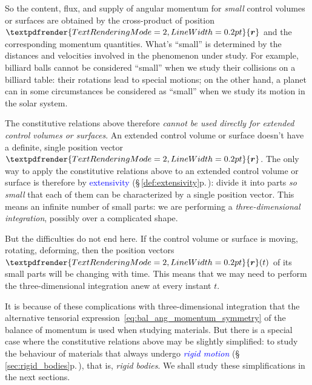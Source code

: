 \documentclass[a4paper,12pt,%
onecolumn,oneside,%
british%
]{memoir}
\renewcommand*{\bm}[1]{\textpdfrender{TextRenderingMode=2,LineWidth=0.2pt}{\boldsymbol{#1}}}
\renewcommand*{\|}[1][]{\nonscript\:#1\vert\nonscript\:\mathopen{}}
\newcommand*{\sect}{\S}%
\renewcommand*{\autoref}[3][\sect\,\ref]{\textcolor{blue}{#3} {\color{blue}\scriptsize(\faIcon[regular]{eye}\;#1{#2}\;p.\,\pageref{#2})}}
\newcommand*{\yr}{\bm{r}}
\begin{document}
\medskip

So the content, flux, and supply of angular momentum for \emph{small} control volumes or surfaces are obtained by the cross-product of position $\yr$ and the corresponding momentum quantities. What's \enquote{small} is determined by the distances and velocities involved in the phenomenon under study. For example, billiard balls cannot be considered \enquote{small} when we study their collisions on a billiard table: their rotations lead to special motions; on the other hand, a planet can in some circumstances be considered as \enquote{small} when we study its motion in the solar system.

The constitutive relations above therefore \emph{cannot be used directly for extended control volumes or surfaces}. An extended control volume or surface doesn't have a definite, single position vector $\yr$. The only way to apply the constitutive relations above to an extended control volume or surface is therefore by \autoref{def:extensivity}{extensivity}: divide it into parts \emph{so small} that each of them can be characterized by a single position vector. This means an infinite number of small parts: we are performing a \emph{three-dimensional integration}, possibly over a complicated shape.

But the difficulties do not end here. If the control volume or surface is moving, rotating, deforming, then the position vectors $\yr(t)$ of its small parts will be changing with time. This means that we may need to perform the three-dimensional integration anew at every instant $t$.

It is because of these complications with three-dimensional integration that the alternative tensorial expression~\eqref{eq:bal_ang_momentum_symmetry} of the balance of momentum is used when studying materials. But there is a special case where the constitutive relations above may be slightly simplified: to study the behaviour of materials that always undergo \autoref{sec:rigid_bodies}{\emph{rigid motion}}, that is, \emph{rigid bodies}. We shall study these simplifications in the next sections.
\end{document}
